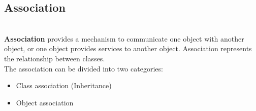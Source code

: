 \subsection{Association}\label{association}
\\
\textbf{Association} provides a mechanism to communicate one object with another object, or one object provides services to another object. Association represents the relationship between classes.
\\
The association can be divided into two categories:

\begin{itemize}
\item
Class association (Inheritance)
\item
Object association
\end{itemize}

\begin{center}
\end{center}

